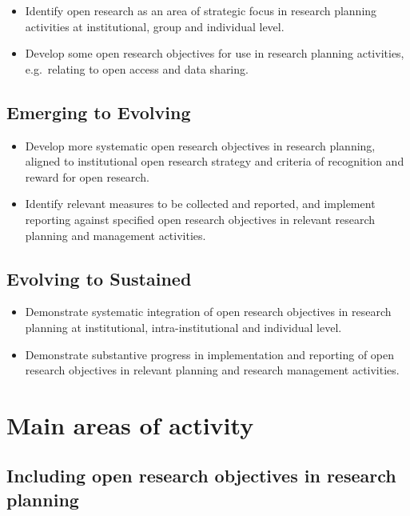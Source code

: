 \documentclass[
  letterpaper,
  DIV=11,
  numbers=noendperiod,
  oneside]{scrreprt}
\begin{document}
\begin{itemize}
\item
  Identify open research as an area of strategic focus in research
  planning activities at institutional, group and individual level.
\item
  Develop some open research objectives for use in research planning
  activities, e.g.~relating to open access and data sharing.
\end{itemize}

\subsection{Emerging to Evolving}\label{emerging-to-evolving-8}

\begin{itemize}
\item
  Develop more systematic open research objectives in research planning,
  aligned to institutional open research strategy and criteria of
  recognition and reward for open research.
\item
  Identify relevant measures to be collected and reported, and implement
  reporting against specified open research objectives in relevant
  research planning and management activities.
\end{itemize}

\subsection{Evolving to Sustained}\label{evolving-to-sustained-8}

\begin{itemize}
\item
  Demonstrate systematic integration of open research objectives in
  research planning at institutional, intra-institutional and individual
  level.
\item
  Demonstrate substantive progress in implementation and reporting of
  open research objectives in relevant planning and research management
  activities.
\end{itemize}

\section{Main areas of activity}\label{main-areas-of-activity-8}

\subsection{Including open research objectives in research
planning}\label{including-open-research-objectives-in-research-planning}
\end{document}

